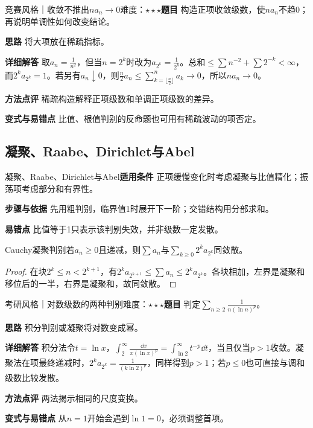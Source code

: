 \begin{example}{竞赛风格｜收敛不推出$na_n\to0$}{难度：$\star\star\star$}\label{deep:ex:series_source_deep:sparse}\textbf{题目} 构造正项收敛级数，使$na_n$不趋0；再说明单调性如何改变结论。\par\textbf{思路} 将大项放在稀疏指标。\par\textbf{详细解答} 取$a_n=\frac{1}{n^2}$，但当$n=2^k$时改为$a_{2^k}=\frac{1}{2^k}$。总和$\le\sum n^{-2}+\sum2^{-k}<\infty$，而$2^ka_{2^k}=1$。若另有$a_n\downarrow0$，则$\frac n2a_n\le\sum_{k=\lfloor \frac{n}{2}\rfloor}^na_k\to0$，所以$na_n\to0$。\par\textbf{方法点评} 稀疏构造解释正项级数和单调正项级数的差异。\par\textbf{变式与易错点} 比值、根值判别的反命题也可用有稀疏波动的项否定。\end{example}

\subsection{凝聚、Raabe、Dirichlet与Abel}\label{deep:series_source_deep:tests}

\begin{method}{凝聚、Raabe、Dirichlet与Abel}\textbf{适用条件} 正项缓慢变化时考虑凝聚与比值精化；振荡项考虑部分和有界性。\par\textbf{步骤与依据} 先用粗判别，临界值1时展开下一阶；交错结构用分部求和。\par\textbf{易错点} 比值等于1只表示该判别失效，并非级数一定发散。\end{method}

\begin{theorem}{Cauchy凝聚判别}若$a_n\ge0$且递减，则$\sum a_n$与$\sum_{k\ge0}2^ka_{2^k}$同敛散。\end{theorem}\begin{proof}在块$2^k\le n<2^{k+1}$，有$2^ka_{2^{k+1}}\le\sum a_n\le2^ka_{2^k}$。各块相加，左界是凝聚和移位后的一半，右界是凝聚和，故同敛散。\end{proof}

\begin{example}{考研风格｜对数级数的两种判别}{难度：$\star\star\star$}\label{deep:ex:series_source_deep:logseries}\textbf{题目} 判定$\sum_{n\ge2}\frac{1}{n(\ln n)^p}$。\par\textbf{思路} 积分判别或凝聚将对数变成幂。\par\textbf{详细解答} 积分法令$t=\ln x$，$\int_2^\infty\frac{\dd x}{x(\ln x)^p}=\int_{\ln2}^\infty t^{-p}\dd t$，当且仅当$p>1$收敛。凝聚法在项最终递减时，$2^ka_{2^k}=\frac{1}{(k\ln2)^p}$，同样得到$p>1$；若$p\le0$也可直接与调和级数比较发散。\par\textbf{方法点评} 两法揭示相同的尺度变换。\par\textbf{变式与易错点} 从$n=1$开始会遇到$\ln1=0$，必须调整首项。\end{example}

